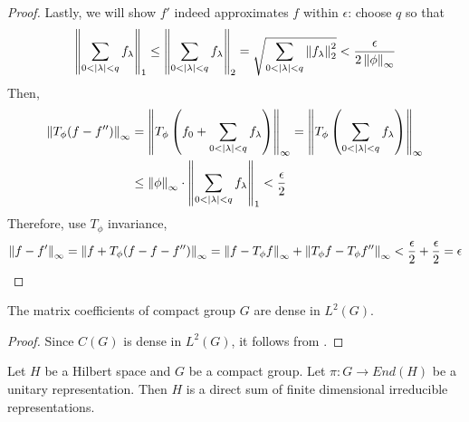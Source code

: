 \begin{proof}
  Lastly, we will show $f'$ indeed approximates $f$ within $\epsilon$: choose
  $q$ so that
  \[
    \left\lVert\sum_{0 < \left|\lambda\right| < q} f_{\lambda}\right\rVert_1
    \leq \left\lVert\sum_{0 < \left|\lambda\right| < q} f_{\lambda}\right\rVert_2
    = \sqrt{\sum_{0 < \left|\lambda\right| < q} \left\lVert f_{\lambda}\right\rVert_2^2}
    < \frac{\epsilon}{2\left\lVert\phi\right\rVert_{\infty}}
  \]
  Then,
  \begin{align*}
    \left\lVert T_{\phi}(f - f'')\right\rVert_{\infty}
    & = \left\lVert T_{\phi} \left( f_0 + \sum_{0 < \left|\lambda\right| < q} f_{\lambda} \right)\right\rVert_{\infty}
    = \left\lVert T_{\phi} \left( \sum_{0 < \left|\lambda\right| < q} f_{\lambda} \right)\right\rVert_{\infty}\\
    & \leq \left\lVert\phi\right\rVert_{\infty} \cdot \left\lVert\sum_{0 < \left|\lambda\right| < q} f_{\lambda}\right\rVert_1
    < \frac{\epsilon}{2}
  \end{align*}
  Therefore, use $T_{\phi}$ invariance,
  \[
    \left\lVert f - f'\right\rVert_{\infty}
    = \left\lVert f + T_{\phi}(f - f - f'')\right\rVert_{\infty}
    = \left\lVert f - T_{\phi}f\right\rVert_{\infty} + \left\lVert T_{\phi}f - T_{\phi}f''\right\rVert_{\infty}
    < \frac{\epsilon}{2} + \frac{\epsilon}{2} = \epsilon
  \]
\end{proof}

\begin{cor}
  The matrix coefficients of compact group $G$ are dense in $L^2(G)$.
\end{cor}

\begin{proof}
  Since $C(G)$ is dense in $L^2(G)$, it follows from .
\end{proof}



\begin{thm} \label{peter-weyl-2}
  Let $H$ be a Hilbert space and $G$ be a compact group. Let $\pi : G \to
  End(H)$ be a unitary representation. Then $H$ is a direct sum of
  finite dimensional irreducible representations.
\end{thm}

